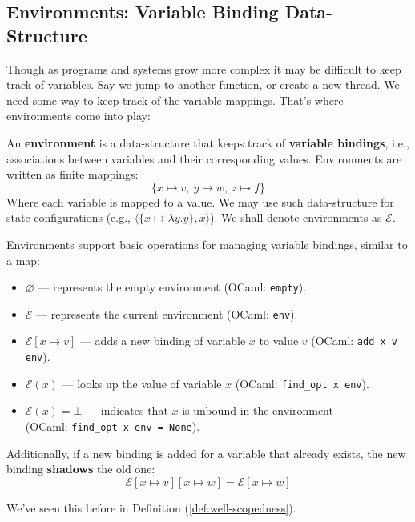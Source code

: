 \subsection{Environments: Variable Binding Data-Structure}
\noindent
Though as programs and systems grow more complex it may be difficult to keep track of variables. Say 
we jump to another function, or create a new thread. We need some way to keep track of the variable mappings.
That's where environments come into play:
\begin{Def}[Environment]

    \label{def:environment}

    \noindent
    An \textbf{environment} is a data-structure that keeps track of \textbf{variable bindings}, i.e., associations between variables and their corresponding values. Environments are written as finite mappings:
    \LARGE
    \[
        \{ x \mapsto v,\ y \mapsto w,\ z \mapsto f \}
    \]
    \normalsize
    Where each variable is mapped to a value. We may use such data-structure for state configurations (e.g., $\langle\{x\mapsto \lambda y.y\}, x  \rangle$). We shall denote environments as $\mathcal{E}$.
\end{Def}
\newpage 
\begin{Def}

    \label{def:env-operations}

    \noindent
    Environments support basic operations for managing variable bindings, similar to a map:

    \begin{itemize}
        \item \(\varnothing\) — represents the empty environment (OCaml: \texttt{empty}).
        \item \(\mathcal{E}\) — represents the current environment (OCaml: \texttt{env}).
        \item \(\mathcal{E}[x \mapsto v]\) — adds a new binding of variable \(x\) to value \(v\) (OCaml: \texttt{add x v env}).
        
        \item \(\mathcal{E}(x)\) — looks up the value of variable \(x\) (OCaml: \texttt{find\_opt x env}).
        
        \item \(\mathcal{E}(x) = \bot\) — indicates that \(x\) is unbound in the environment\\ (OCaml: \texttt{find\_opt x env = None}).
    \end{itemize}

    \noindent
    Additionally, if a new binding is added for a variable that already exists, the new binding \textbf{shadows} the old one:
    \[
    \mathcal{E}[x \mapsto v][x \mapsto w] = \mathcal{E}[x \mapsto w]
    \]
\end{Def}


\noindent
We've seen this before in Definition (\ref{def:well-scopedness}).
